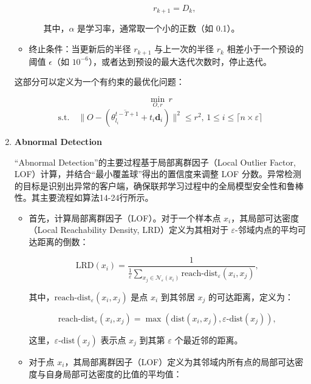 \documentclass[lettersize,journal]{IEEEtran}
\begin{document}
\begin{enumerate}
\begin{itemize}
\begin{itemize}
        \begin{equation}
        r_{k+1} = D_k,
        \end{equation}

        其中，\( \alpha \) 是学习率，通常取一个小的正数（如 0.1）。
    \end{itemize}
    \item 终止条件：当更新后的半径 \( r_{k+1} \) 与上一次的半径 \( r_k \) 相差小于一个预设的阈值 \( \epsilon \)（如 \( 10^{-6} \)），或者达到预设的最大迭代次数时，停止迭代。
\end{itemize}

这部分可以定义为一个有约束的最优化问题：

\begin{equation}
\min_{O, r} \, r 
\end{equation}
$$
\text{s.t.} \quad \| O - (\overline{\theta_{l_i}^{t-T+1}} + t_i \mathbf{d}_i) \|^2 \leq r^2, \, 1\leq i\leq \lceil n \times \varepsilon \rceil
$$

\item \textbf{Abnormal Detection}

“Abnormal Detection”的主要过程基于局部离群因子（Local Outlier Factor, LOF）计算，并结合“最小覆盖球”得出的置信度来调整 LOF 分数。异常检测的目标是识别出异常的客户端，确保联邦学习过程中的全局模型安全性和鲁棒性。其主要流程如算法14-24行所示。

\begin{itemize}
    \item 首先，计算局部离群因子（LOF）。对于一个样本点 \(x_i\)，其局部可达密度（Local Reachability Density, LRD）定义为其相对于 \(\varepsilon\)-邻域内点的平均可达距离的倒数：

    \begin{equation}
    \text{LRD}(x_i) = \frac{1}{\frac{1}{\varepsilon} \sum_{x_j \in \mathcal{N}_\varepsilon(x_i)} \text{reach-dist}_\varepsilon(x_i, x_j)},
    \end{equation}

    其中，\(\text{reach-dist}_\varepsilon(x_i, x_j)\) 是点 \(x_i\) 到其邻居 \(x_j\) 的可达距离，定义为：

    \begin{equation}
    \text{reach-dist}_\varepsilon(x_i, x_j) = \max(\text{dist}(x_i, x_j), \varepsilon\text{-dist}(x_j)),
    \end{equation}

    这里，\(\varepsilon\text{-dist}(x_j)\) 表示点 \(x_j\) 到其第 \(\varepsilon\) 个最近邻的距离。

    \item 对于点 \(x_i\)，其局部离群因子（LOF）定义为其邻域内所有点的局部可达密度与自身局部可达密度的比值的平均值：


\end{itemize}
\end{enumerate}
\end{document}

